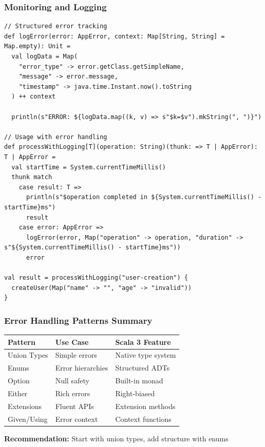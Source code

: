 \documentclass{beamer}
\begin{document}
\begin{frame}[fragile]
\frametitle{Monitoring and Logging}

\begin{lstlisting}[style=scalaStyle]
// Structured error tracking
def logError(error: AppError, context: Map[String, String] = Map.empty): Unit =
  val logData = Map(
    "error_type" -> error.getClass.getSimpleName,
    "message" -> error.message,
    "timestamp" -> java.time.Instant.now().toString
  ) ++ context
  
  println(s"ERROR: ${logData.map((k, v) => s"$k=$v").mkString(", ")}")

// Usage with error handling
def processWithLogging[T](operation: String)(thunk: => T | AppError): T | AppError =
  val startTime = System.currentTimeMillis()
  thunk match
    case result: T => 
      println(s"$operation completed in ${System.currentTimeMillis() - startTime}ms")
      result
    case error: AppError => 
      logError(error, Map("operation" -> operation, "duration" -> s"${System.currentTimeMillis() - startTime}ms"))
      error

val result = processWithLogging("user-creation") {
  createUser(Map("name" -> "", "age" -> "invalid"))
}
\end{lstlisting}

\end{frame}

\begin{frame}[fragile]
\frametitle{Error Handling Patterns Summary}

\begin{table}[ht]
\centering
\small
\begin{tabular}{|l|l|l|}
\hline
\textbf{Pattern} & \textbf{Use Case} & \textbf{Scala 3 Feature} \\
\hline
Union Types & Simple errors & Native type system \\
\hline
Enums & Error hierarchies & Structured ADTs \\
\hline
Option & Null safety & Built-in monad \\
\hline
Either & Rich errors & Right-biased \\
\hline
Extensions & Fluent APIs & Extension methods \\
\hline
Given/Using & Error context & Context functions \\
\hline
\end{tabular}
\end{table}

\textbf{Recommendation:} Start with union types, add structure with enums

\end{frame}
\end{document}
